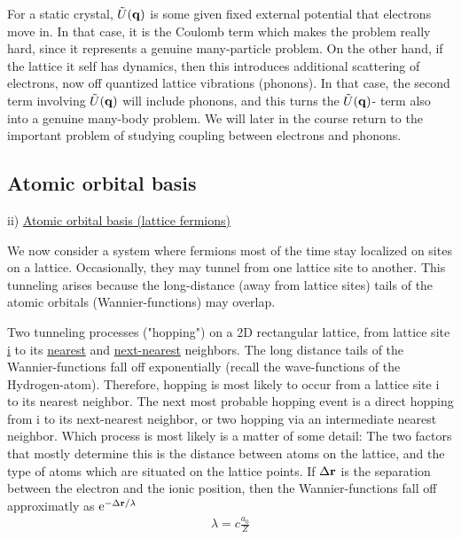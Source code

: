\noindent For a static crystal, $\tilde{U}(\vb{q})$ is some given fixed external potential that electrons move in. In that case, it is the Coulomb term which makes the problem really hard, since it represents a genuine many-particle problem. On the other hand, if the lattice it self has dynamics, then this introduces additional scattering of electrons, now off quantized lattice vibrations (phonons). In that case, the second term involving $\tilde{U}(\vb{q})$ will include phonons, and this turns the $\tilde{U}(\vb{q})$- term also into a genuine many-body problem. We will later in the course return to the important problem of studying coupling between electrons and phonons.\newline

\subsection{Atomic orbital basis}

\noindent ii) \uline{Atomic orbital basis (lattice fermions)}

\noindent We now consider a system where fermions most of the time stay localized on sites on a lattice. Occasionally, they may tunnel from one lattice site to another. This tunneling arises because the long-distance (away from lattice sites) tails of the atomic orbitals (Wannier-functions) may overlap.

\begin{center}
\end{center}
\noindent Two tunneling processes ("hopping") on a 2D rectangular lattice, from lattice site \uline{i} to its \uline{nearest} and \uline{next-nearest} neighbors. The long distance tails of the Wannier-functions fall off exponentially (recall the wave-functions of the Hydrogen-atom). Therefore, hopping is most likely to occur from a lattice site i to its nearest neighbor. The next most probable hopping event is a direct hopping from i to its next-nearest neighbor, or two hopping via an intermediate nearest neighbor. Which process is most likely is a matter of some detail: The two factors that mostly determine this is the distance between atoms on the lattice, and the type of atoms which are situated on the lattice points. If $\Delta \vb{r}$ is the separation between the electron and the ionic position, then the Wannier-functions fall off approximatly as $\mathrm{e}^{-\Delta \vb{r}/\lambda}$
\begin{align*}
	\lambda = c \frac{a_0}{Z}
\end{align*}

